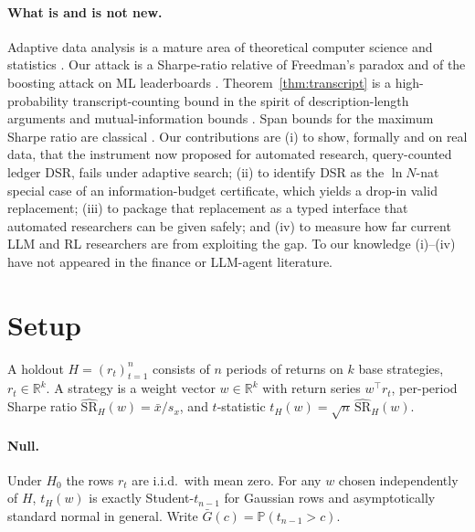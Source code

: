 \documentclass[11pt]{article}
\theoremstyle{definition}
\theoremstyle{remark}
\newcommand{\Prob}{\mathbb{P}}
\newcommand{\SR}{\widehat{\mathrm{SR}}}
\newcommand{\tH}{t_{H}}
\begin{document}
\paragraph{What is and is not new.} Adaptive data analysis is a mature area of theoretical computer science and statistics \citep{dwork2015science,dwork2015generalization,hardt2014preventing,bassily2016algorithmic,russo2016controlling,xu2017information}. Our attack is a Sharpe-ratio relative of Freedman's paradox \citep{freedman1983note} and of the boosting attack on ML leaderboards \citep{blum2015ladder}. Theorem~\ref{thm:transcript} is a high-probability transcript-counting bound in the spirit of description-length arguments \citep{dwork2015generalization} and mutual-information bounds \citep{russo2016controlling}. Span bounds for the maximum Sharpe ratio are classical \citep{scheffe1953method,gibbons1989test}. Our contributions are (i) to show, formally and on real data, that the instrument now proposed for automated research, query-counted ledger DSR, fails under adaptive search; (ii) to identify DSR as the $\ln N$-nat special case of an information-budget certificate, which yields a drop-in valid replacement; (iii) to package that replacement as a typed interface that automated researchers can be given safely; and (iv) to measure how far current LLM and RL researchers are from exploiting the gap. To our knowledge (i)--(iv) have not appeared in the finance or LLM-agent literature.

\section{Setup}
A holdout $H=(r_t)_{t=1}^n$ consists of $n$ periods of returns on $k$ base strategies, $r_t\in\mathbb R^k$. A strategy is a weight vector $w\in\mathbb R^k$ with return series $w^\top r_t$, per-period Sharpe ratio $\SR_H(w)=\bar x/s_x$, and $t$-statistic $\tH(w)=\sqrt n\,\SR_H(w)$.

\paragraph{Null.} Under $H_0$ the rows $r_t$ are i.i.d.\ with mean zero. For any $w$ chosen independently of $H$, $\tH(w)$ is exactly Student-$t_{n-1}$ for Gaussian rows and asymptotically standard normal in general. Write $\bar G(c)=\Prob(t_{n-1}>c)$.
\end{document}
